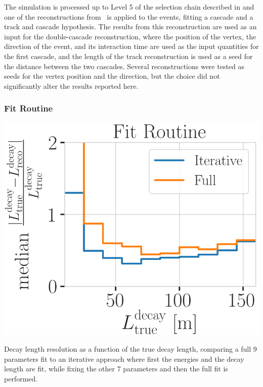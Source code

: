 The simulation is processed up to Level 5 of the selection chain described in  and one of the reconstructions from~ is applied to the events, fitting a cascade and a track and cascade hypothesis. The results from this reconstruction are used as an input for the double-cascade reconstruction, where the position of the vertex, the direction of the event, and its interaction time are used as the input quantities for the first cascade, and the length of the track reconstruction is used as a seed for the distance between the two cascades. Several reconstructions were tested as seeds for the vertex position and the direction, but the choice did not significantly alter the results reported here.


\subsubsection{Fit Routine}

\begin{marginfigure}
	\centering
    \includegraphics{figures/results/190605_reco_optimization/fit_routine_splitting_median_decay_length_resolution_Good + L7 + reco E1,E2 above 3_fix_y_new.png}
    \caption[Decay length resolution to optimize fit routine]{Decay length resolution as a function of the true decay length, comparing a full 9 parameters fit to an iterative approach where first the energies and the decay length are fit, while fixing the other 7 parameters and then the full fit is performed.}
\end{marginfigure}


